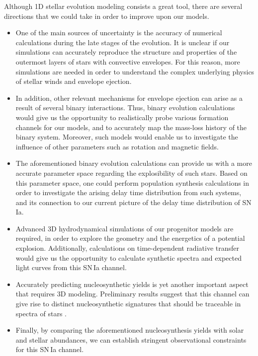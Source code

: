\documentclass[../../main/thesis_msc.tex]{subfiles}
\begin{document}
		
		Although 1D stellar evolution modeling consists a great tool, there are several directions that we could take in order to improve upon our models.
		\begin{itemize}
			\item One of the main sources of uncertainty is the accuracy of numerical calculations during the late stages of the evolution. It is unclear if our simulations can accurately reproduce the structure and properties of the outermost layers of stars with convective envelopes. For this reason, more simulations are needed in order to understand the complex underlying physics of stellar winds and envelope ejection.
			
			\item In addition, other relevant mechanisms for envelope ejection can arise as a result of several binary interactions. Thus, binary evolution calculations would give us the opportunity to realistically probe various formation channels for our models, and to accurately map the mass-loss history of the binary system. Moreover, such models would enable us to investigate the influence of other parameters such as rotation and magnetic fields.
			
			\item  The aforementioned binary evolution calculations can provide us with a more accurate parameter space regarding the explosibility of such stars. Based on this parameter space, one could perform population synthesis calculations in order to investigate the arising delay time distribution from such systems, and its connection to our current picture of the delay time distribution of SN\,Ia.
			
			\item Advanced 3D hydrodynamical simulations of our progenitor models are required, in order to explore the geometry and the energetics of a potential explosion. Additionally, calculations on time-dependent radiative transfer would give us the opportunity to calculate synthetic spectra and expected light curves from this SN\,Ia channel.
			
			\item Accurately predicting nucleosynthetic yields is yet another important aspect that requires 3D modeling. Preliminary results suggest that this channel can give rise to distinct nucleosynthetic signatures that should be traceable in spectra of stars \citep{Jones:2018ule}.
			
			\item Finally, by comparing the aforementioned nucleosynthesis yields with solar and stellar abundances, we can establish stringent observational constraints for this SN\,Ia channel.
			
		
		\end{itemize}
		

		
\end{document}

